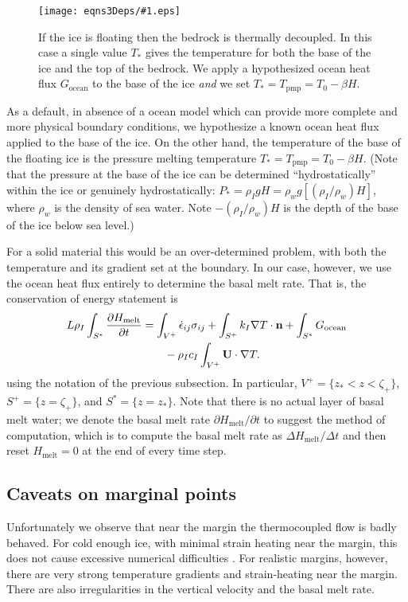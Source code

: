 \documentclass[12pt,final]{amsart}%
\theoremstyle{plain}
\theoremstyle{definition}
\theoremstyle{remark}
\newcommand{\regfigure}[2]{\texttt{[image: eqns3Deps/\#1.eps]}}
\newcommand{\ddt}[1]{\ensuremath{\frac{\partial #1}{\partial t}}}
\def\eps{\epsilon}
\newcommand{\grad}{\nabla}
\newcommand{\nhat}{\mathbf{n}}
\newcommand{\Tpmp}{T_{\text{pmp}}}
\newcommand{\bU}{{\mathbf{U}}}
\begin{document}
\begin{figure}[ht]
\regfigure{floatingcase}{3}
\caption{If the ice is floating then the bedrock is thermally decoupled.  In this case a single value $T_\ast$ gives the temperature for both the base of the ice and the top of the bedrock.  We apply a hypothesized ocean heat flux $G_{\text{ocean}}$ to the base of the ice \emph{and} we set $T_\ast = \Tpmp = T_0 - \beta H$.}
\label{fig:floatingcase}
\end{figure}

As a default, in absence of a ocean model which can provide more complete and more physical boundary conditions, we hypothesize a known ocean heat flux applied to the base of the ice.  On the other hand, the temperature of the base of the floating ice is the pressure melting temperature $T_\ast = \Tpmp = T_0 - \beta H$.  (Note that the pressure at the base of the ice can be determined ``hydrostatically'' within the ice or genuinely hydrostatically: $P_\ast = \rho_I g H = \rho_w g \left[(\rho_I/\rho_w) H\right]$, where $\rho_w$ is the density of sea water.  Note $-(\rho_I/\rho_w) H$ is the depth of the base of the ice below sea level.)

For a solid material this would be an over-determined problem, with both the temperature and its gradient set at the boundary.  In our case, however, we use the ocean heat flux entirely to determine the basal melt rate.  That is, the conservation of energy statement is
\begin{align}
L \rho_I \int_{S^\ast} \ddt{H_{\text{melt}}} &= \int_{V^+} \dot \eps_{ij} \sigma_{ij} + \int_{S^+} k_I \grad T \cdot \nhat + \int_{S^\ast} G_{\text{ocean}} \label{basefloating}\\
    &\qquad - \rho_I c_I\int_{V^+} \bU\cdot \grad T.\notag
\end{align}
using the notation of the previous subsection.  In particular, $V^+ = \{z_\ast < z < \zeta_+\}$, $S^+ = \{z=\zeta_+\}$, and $S^\ast = \{z=z_\ast\}$.  Note that there is no actual layer of basal melt water; we denote the basal melt rate $\partial H_{\text{melt}}/\partial t$ to suggest the method of computation, which is to compute the basal melt rate as $\Delta H_{\text{melt}}/\Delta t$ and then reset $H_{\text{melt}}=0$ at the end of every time step.

\subsection*{Caveats on marginal points}  Unfortunately we observe that near the margin the thermocoupled flow is badly behaved.  For cold enough ice, with minimal strain heating near the margin, this does not cause excessive numerical difficulties \citep{BBL}.  For realistic margins, however, there are very strong temperature gradients and strain-heating near the margin.  There are also irregularities in the vertical velocity and the basal melt rate.
\end{document}
